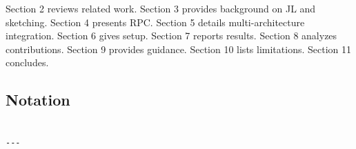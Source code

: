 Section 2 reviews related work. Section 3 provides background on JL and 
sketching. Section 4 presents RPC. Section 5 details multi-architecture 
integration. Section 6 gives setup. Section 7 reports results. Section 8 
analyzes contributions. Section 9 provides guidance. Section 10 lists 
limitations. Section 11 concludes.



\subsection{Notation}

\begin{lstlisting}

---
\end{lstlisting}